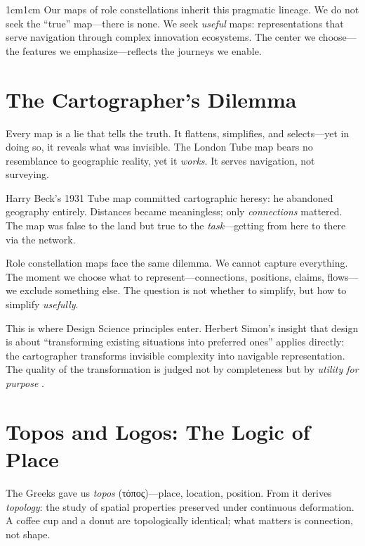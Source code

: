 \documentclass[../main.tex]{subfiles}
\begin{document}
\begin{adjustwidth}{1cm}{1cm}
Our maps of role constellations inherit this pragmatic lineage. We do not seek the ``true'' map---there is none. We seek \textit{useful} maps: representations that serve navigation through complex innovation ecosystems. The center we choose---the features we emphasize---reflects the journeys we enable.

\vspace{0.8cm}

\section*{The Cartographer's Dilemma}

Every map is a lie that tells the truth. It flattens, simplifies, and selects---yet in doing so, it reveals what was invisible. The London Tube map bears no resemblance to geographic reality, yet it \textit{works}. It serves navigation, not surveying.

Harry Beck's 1931 Tube map committed cartographic heresy: he abandoned geography entirely. Distances became meaningless; only \textit{connections} mattered. The map was false to the land but true to the \textit{task}---getting from here to there via the network.

Role constellation maps face the same dilemma. We cannot capture everything. The moment we choose what to represent---connections, positions, claims, flows---we exclude something else. The question is not whether to simplify, but how to simplify \textit{usefully}.

This is where Design Science principles enter. Herbert Simon's insight that design is about ``transforming existing situations into preferred ones'' \cite{simon1996sciences} applies directly: the cartographer transforms invisible complexity into navigable representation. The quality of the transformation is judged not by completeness but by \textit{utility for purpose} .

\vspace{0.8cm}

\section*{Topos and Logos: The Logic of Place}

The Greeks gave us \textit{topos} (τόπος)---place, location, position. From it derives \textit{topology}: the study of spatial properties preserved under continuous deformation. A coffee cup and a donut are topologically identical; what matters is connection, not shape.


\end{adjustwidth}
\end{document}
